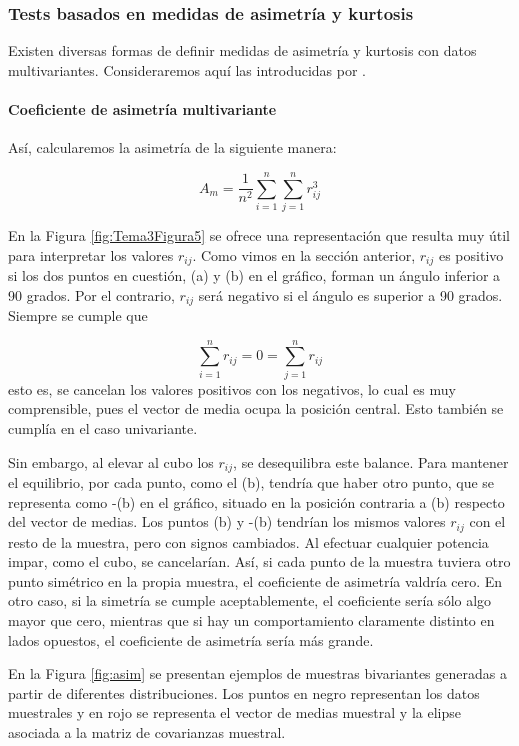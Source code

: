 \documentclass[
  a4paper,
  oneside]{scrbook}
\theoremstyle{definition}
\theoremstyle{definition}
\theoremstyle{definition}
\theoremstyle{definition}
\theoremstyle{remark}
\begin{document}
\subsubsection{Tests basados en medidas de asimetría y kurtosis}\label{tests-basados-en-medidas-de-asimetria-y-kurtosis}

Existen diversas formas de definir medidas de asimetría y kurtosis con
datos multivariantes. Consideraremos aquí las introducidas por \citet{mardia70}.

\paragraph{Coeficiente de asimetría multivariante}\label{coeficiente-de-asimetria-multivariante}

Así, calcularemos la asimetría de la siguiente manera:

\[A_m=\frac{1}{n^2}\sum_{i=1}^n\sum_{j=1}^n r_{ij}^3\]

En la Figura \ref{fig:Tema3Figura5} se ofrece una representación que resulta muy
útil para interpretar los valores \(r_{ij}\). Como vimos en la sección
anterior, \(r_{ij}\) es positivo si los dos puntos en cuestión, (a) y (b)
en el gráfico, forman un ángulo inferior a 90 grados. Por el contrario,
\(r_{ij}\) será negativo si el ángulo es superior a 90 grados. Siempre se
cumple que

\[\sum_{i=1}^n r_{ij}=0=\sum_{j=1}^n r_{ij}\] esto es, se
cancelan los valores positivos con los negativos, lo cual es muy
comprensible, pues el vector de media ocupa la posición central. Esto
también se cumplía en el caso univariante.

Sin embargo, al elevar al cubo los \(r_{ij}\), se desequilibra este
balance. Para mantener el equilibrio, por cada punto, como el (b),
tendría que haber otro punto, que se representa como -(b) en el gráfico,
situado en la posición contraria a (b) respecto del vector de medias.
Los puntos (b) y -(b) tendrían los mismos valores \(r_{ij}\) con el resto
de la muestra, pero con signos cambiados. Al efectuar cualquier potencia
impar, como el cubo, se cancelarían. Así, si cada punto de la muestra
tuviera otro punto simétrico en la propia muestra, el coeficiente de
asimetría valdría cero. En otro caso, si la simetría se cumple
aceptablemente, el coeficiente sería sólo algo mayor que cero, mientras
que si hay un comportamiento claramente distinto en lados opuestos, el
coeficiente de asimetría sería más grande.

En la Figura \ref{fig:asim} se presentan ejemplos de muestras bivariantes generadas a partir de
diferentes distribuciones. Los puntos en negro representan los datos
muestrales y en rojo se representa el vector de medias muestral y la
elipse asociada a la matriz de covarianzas muestral.
\end{document}
